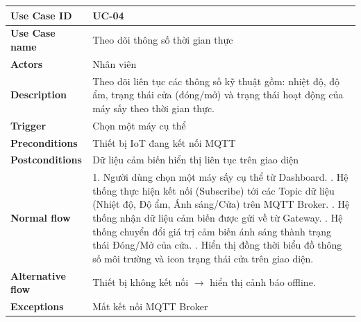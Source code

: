 \begin{tabular}{|p{3.5cm}|p{9.5cm}|}
\hline
\textbf{Use Case ID} & UC-04 \\
\hline
\textbf{Use Case name} & Theo dõi thông số thời gian thực \\
\hline
\textbf{Actors} & Nhân viên \\
\hline
\textbf{Description} & 
Theo dõi liên tục các thông số kỹ thuật gồm: nhiệt độ, độ ẩm, trạng thái cửa (đóng/mở) và trạng thái hoạt động của máy sấy theo thời gian thực. \\
\hline
\textbf{Trigger} & Chọn một máy cụ thể \\
\hline
\textbf{Preconditions} & Thiết bị IoT đang kết nối MQTT \\
\hline
\textbf{Postconditions} & Dữ liệu cảm biến hiển thị liên tục trên giao diện \\
\hline
\textbf{Normal flow} & 
1. Người dùng chọn một máy sấy cụ thể từ Dashboard. \newline
2. Hệ thống thực hiện kết nối (Subscribe) tới các Topic dữ liệu (Nhiệt độ, Độ ẩm, Ánh sáng/Cửa) trên MQTT Broker. \newline
3. Hệ thống nhận dữ liệu cảm biến được gửi về từ Gateway. \newline 
4. Hệ thống chuyển đổi giá trị cảm biến ánh sáng thành trạng thái Đóng/Mở của cửa. \newline 5. Hiển thị đồng thời biểu đồ thông số môi trường và icon trạng thái cửa trên giao diện. \\
\hline
\textbf{Alternative flow} & 
Thiết bị không kết nối $\rightarrow$ hiển thị cảnh báo offline. \\
\hline
\textbf{Exceptions} & Mất kết nối MQTT Broker \\
\hline
\end{tabular}


